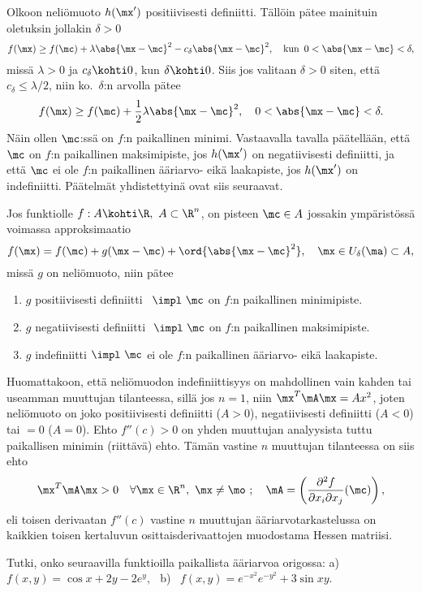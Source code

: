 Olkoon neliömuoto $h(\mx')$ positiivisesti definiitti. Tällöin pätee mainituin oletuksin jollakin
$\delta>0$
\[
f(\mx) \ge f(\mc)+\lambda\abs{\mx-\mc}^2-c_\delta\abs{\mx-\mc}^2, \quad
                               \text{kun}\,\ 0<\abs{\mx-\mc}<\delta,
\]
missä $\lambda>0$ ja $c_\delta\kohti 0$, kun $\delta\kohti 0$. Siis jos valitaan $\delta>0$ 
siten, että $c_\delta\leq \lambda/2$, niin ko.\ $\delta$:n arvolla pätee
\[
f(\mx) \ge f(\mc)+\frac{1}{2}\lambda\abs{\mx-\mc}^2, \quad 0<\abs{\mx-\mc}<\delta.
\]
Näin ollen $\mc$:ssä on $f$:n paikallinen minimi. Vastaavalla tavalla päätellään, että $\mc$
on $f$:n paikallinen maksimipiste, jos $h(\mx')$ on negatiivisesti definiitti, ja että $\mc$ ei ole 
$f$:n paikallinen ääriarvo- eikä laakapiste, jos $h(\mx')$ on indefiniitti. Päätelmät
yhdistettyinä ovat siis seuraavat.
\begin{Prop} \label{ääriarvokriteerit Rn:ssä}
Jos funktiolle $f:A\kohti\R,\ A\subset\R^n$, on pisteen $\mc\in A$ jossakin ympäristössä
voimassa approksimaatio
\[
f(\mx)=f(\mc)+g(\mx-\mc)+\ord{\abs{\mx-\mc}^2}, \quad \mx \in U_\delta(\ma) \subset A,
\]
missä $g$ on neliömuoto, niin pätee
\begin{enumerate}
\item $g$ positiivisesti definiitti $\ \, \impl \ \mc$ on $f$:n paikallinen minimipiste.
\item $g$ negatiivisesti definiitti $\ \impl \ \mc$ on $f$:n paikallinen maksimipiste.
\item $g$ indefiniitti $\impl \ \mc$ ei ole $f$:n paikallinen ääriarvo- eikä laakapiste.
\end{enumerate}
\end{Prop}
Huomattakoon, että neliömuodon indefiniittisyys on mahdollinen vain kahden tai useamman 
muuttujan tilanteessa, sillä jos $n=1$, niin $\mx^T\mA\mx=Ax^2$, joten neliömuoto on joko
positiivisesti definiitti ($A>0$), negatiivisesti definiitti ($A<0$) tai $=0$ ($A=0$). Ehto
$f''(c)>0$ on yhden muuttujan analyysista tuttu paikallisen minimin (riittävä) ehto. Tämän
vastine $n$ muuttujan tilanteessa on siis ehto
\[
\mx^T\mA\mx>0\quad\forall\mx\in\R^n,\ \mx\neq\mo\ ;\quad 
            \mA=\left(\frac{\partial^2 f}{\partial x_i\partial x_j}(\mc)\right),
\]
eli toisen derivaatan $f''(c)$ vastine $n$ muuttujan ääriarvotarkastelussa on kaikkien toisen
kertaluvun osittaisderivaattojen muodostama Hessen matriisi.
\begin{Exa}
Tutki, onko seuraavilla funktioilla paikallista ääriarvoa origossa: \vspace{1mm}\newline
a) \ $f(x,y)=\cos x+2y-2e^y,\,\ $ b) \ $f(x,y)=e^{-x^2}e^{-y^2}+3\sin xy$.
\end{Exa}
